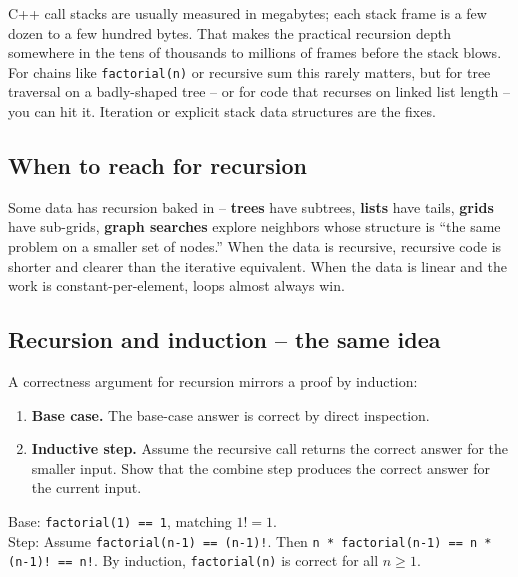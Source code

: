 \documentclass[11pt]{article}
\begin{document}
\begin{warnbox}
C++ call stacks are usually measured in megabytes; each stack frame
is a few dozen to a few hundred bytes. That makes the practical
recursion depth somewhere in the tens of thousands to millions of
frames before the stack blows. For chains like \texttt{factorial(n)}
or recursive sum this rarely matters, but for tree traversal on a
badly-shaped tree -- or for code that recurses on linked list length
-- you can hit it. Iteration or explicit stack data structures are
the fixes.
\end{warnbox}

\subsection{When to reach for recursion}

\begin{ideabox}
Some data has recursion baked in -- \textbf{trees} have subtrees,
\textbf{lists} have tails, \textbf{grids} have sub-grids, \textbf{graph
searches} explore neighbors whose structure is ``the same problem on
a smaller set of nodes.'' When the data is recursive, recursive code
is shorter and clearer than the iterative equivalent. When the data
is linear and the work is constant-per-element, loops almost always
win.
\end{ideabox}

\subsection{Recursion and induction -- the same idea}

A correctness argument for recursion mirrors a proof by induction:

\begin{enumerate}[leftmargin=*,noitemsep]
    \item \textbf{Base case.} The base-case answer is correct by
          direct inspection.
    \item \textbf{Inductive step.} Assume the recursive call returns
          the correct answer for the smaller input. Show that the
          combine step produces the correct answer for the current
          input.
\end{enumerate}

\begin{examplebox}
Base: \texttt{factorial(1) == 1}, matching $1! = 1$. \\
Step: Assume \texttt{factorial(n-1) == (n-1)!}. Then
\texttt{n * factorial(n-1) == n * (n-1)! == n!}. By induction,
\texttt{factorial(n)} is correct for all $n \ge 1$.
\end{examplebox}
\end{document}
